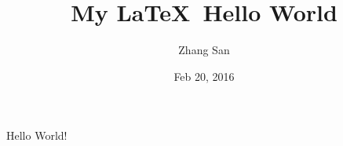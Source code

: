 \documentclass{article}
\title{My \LaTeX ~Hello World}
\author{Zhang San}
\date{Feb 20, 2016}
\begin{document}
\maketitle
Hello World!
\end{document}
